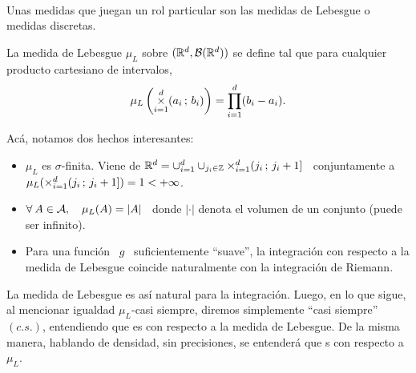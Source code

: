 \

Unas medidas que juegan un rol  particular son las medidas de Lebesgue o medidas
discretas.
%
\begin{definicion}
\label{Def:MP:Lebesgue}
%
  La medida de Lebesgue $\mu_L$  sobre $(\mathbb{R}^d,\mathcal{B}(\mathbb{R}^d))$ se define tal que
  para cualquier producto cartesiano de intervalos,
  \[
  \mu_L\left(  \operatorname*{\times}_{i=1}^d  (a_i  \,  ;  \, b_i)  \right)  =  \prod_{i=1}^d
  (b_i-a_i).
  \]
\end{definicion}
%
Ac\'a, notamos dos hechos interesantes:
%
\begin{itemize}
%
\item $\mu_L$ es $\sigma$-finita. Viene de $\mathbb{R}^d = \cup_{i=1}^d \cup_{j_i \in
    \mathbb{Z}}  \operatorname*{\times}_{i=1}^d   (  j_i  \,   ;  \,  j_i+1]$  \   conjuntamente  a
  $\mu_L(\operatorname*{\times}_{i=1}^d ( j_i \, ; \, j_i+1]) = 1 < +\infty$.
%
\item $\forall \:  A \in \mathcal{A}, \quad  \mu_L(A) = |A|$ \ donde  $|\cdot|$ denota el
  volumen de un conjunto (puede ser infinito).
%
\item Para una funci\'on \ $g$ \ suficientemente ``suave'', la integraci\'on con
  respecto a la medida de Lebesgue coincide naturalmente con la integraci\'on de
  Riemann.
\end{itemize}
%
La medida de  Lebesgue es as\'i natural para la integraci\'on.  Luego, en lo que
sigue, al  mencionar igualdad  $\mu_L$-casi siempre, diremos  simplemente ``casi
siempre'' $(c.s.)$, entendiendo que es con  respecto a la medida de Lebesgue. De
la misma manera, hablando de densidad, sin precisiones, se entender\'a que s con
respecto a $\mu_L$.

